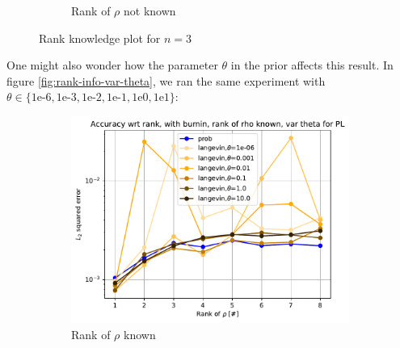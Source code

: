 \documentclass[12pt]{memoir}
\begin{document}
\begin{figure}[H]
\begin{subfigure}[b]{0.49\textwidth}
        \caption{Rank of $\rho$ not known}

        \label{fig:rank-no-info-sub}

    \end{subfigure}

    \caption{Rank knowledge plot for $n=3$}

    \label{fig:rank-info}

\end{figure}


One might also wonder how the parameter $\theta$ in the prior affects this result. In figure \ref{fig:rank-info-var-theta}, we ran the same experiment with $\theta \in \{1\text{e-}6,1\text{e-}3,1\text{e-}2,1\text{e-}1,1\text{e}0, 1\text{e}1\}$:


\begin{figure}[H]

    \centering

    \begin{subfigure}[b]{0.49\textwidth}


        \centering

        \includegraphics[width=\textwidth]{figures/experiments/rank_info/rank_known_var_theta_pl-1.png}

        \caption{Rank of $\rho$ known}

        \label{fig:rank-info-var-theta-sub}

    \end{subfigure}
    \hfill
    \begin{subfigure}[b]{0.49\textwidth}


\end{subfigure}
\end{figure}
\end{document}
